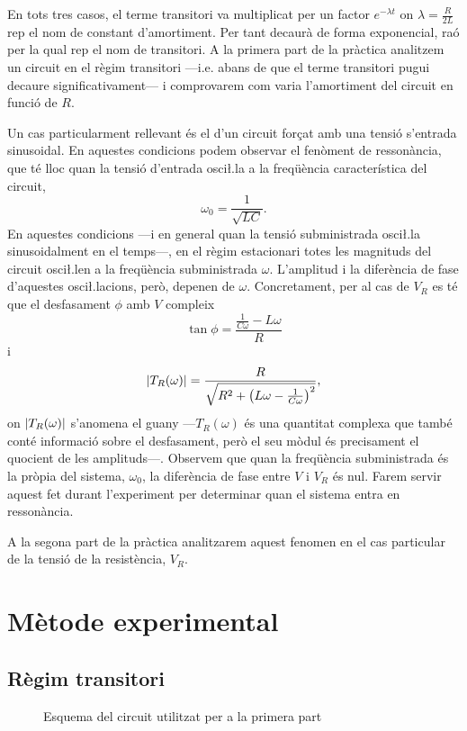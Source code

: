 En tots tres casos, el terme transitori va multiplicat per un factor \( e^{-\lambda t} \) on \( \lambda = \frac{R}{2L} \) rep el nom de constant d'amortiment. Per tant decaurà de forma exponencial, raó per la qual rep el nom de transitori. A la primera part de la pràctica analitzem un circuit en el règim transitori ---i.e. abans de que el terme transitori pugui decaure significativament--- i comprovarem com varia l'amortiment del circuit en funció de \( R \).  

Un cas particularment rellevant és el d'un circuit forçat amb una tensió s'entrada sinusoidal. En aquestes condicions podem observar el fenòment de ressonància, que té lloc quan la tensió d'entrada osci\l.la a la freqüència característica del circuit, 
\begin{equation}\label{eq:freq ressonancia}
	\omega_0 = \frac{1}{\sqrt{LC}}.
\end{equation}
En aquestes condicions ---i en general quan la tensió subministrada osci\l.la sinusoidalment en el temps---, en el règim estacionari totes les magnituds del circuit osci\l.len a la freqüència subministrada \( \omega \). L'amplitud i la diferència de fase d'aquestes osci\l.lacions, però, depenen de \( \omega \). Concretament, per al cas de \( V_R \) es té que el desfasament \( \phi \) amb \( V \) compleix
\begin{equation} \label{eq:desfasament}
	\tan{\phi} = \frac{\frac{1}{C\omega} - L\omega}{R}
\end{equation}
i 
\begin{equation} \label{eq:guany}
	\left\lvert T_R(\omega) \right\rvert = \frac{R}{\sqrt{R^2 + \left(L\omega - \frac{1}{C\omega}\right)^2}},
\end{equation}
on \( \left\lvert T_R(\omega) \right\rvert \) s'anomena el guany ---\( T_R(\omega) \) és una quantitat complexa que també conté informació sobre el desfasament, però el seu mòdul és precisament el quocient de les amplituds---. Observem que quan la freqüència subministrada és la pròpia del sistema, \( \omega_0 \), la diferència de fase entre \( V \) i \( V_R \) és nul. Farem servir aquest fet durant l'experiment per determinar quan el sistema entra en ressonància. 

A la segona part de la pràctica analitzarem aquest fenomen en el cas particular de la tensió de la resistència, \( V_R \).   

\section{Mètode experimental}
\subsection{Règim transitori}
\begin{figure}[htb]
	\centering \small \sffamily
	
	\caption{Esquema del circuit utilitzat per a la primera part}
	\label{fig:esquema transitori}
\end{figure}

